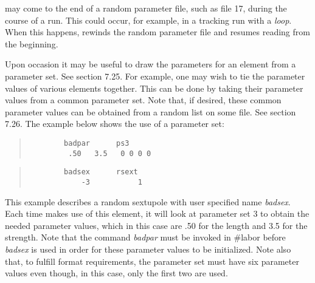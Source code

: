          \Mary may come to the end of a random parameter file, such as
file 17, during the course of a run.  This could occur, for example, in a
tracking run with a {\em loop}.  When this happens, \Mary rewinds the random
parameter file and resumes reading from the beginning.

Upon occasion it may be useful to draw the parameters for an element from
a parameter set.  See section 7.25.  For example, one may wish to tie the
parameter values of various elements together.  This can be done by
taking their parameter values from a common parameter set.  Note that, if
desired, these common parameter values can be obtained from a random list
on some file.  See section 7.26.  The example below shows the use of a
parameter set:
\begin{quotation}
\begin{verbatim}
        badpar      ps3
         .50   3.5   0 0 0 0
\end{verbatim}
\end{quotation}
\begin{quotation}
\begin{verbatim}
        badsex      rsext
            -3           1
\end{verbatim}
\end{quotation}
This example describes a random sextupole with user specified name {\em
badsex}.  Each time \Mary makes use of this element, it will look at
parameter set 3 to obtain the needed parameter values, which in this case
are .50 for the length and 3.5 for the strength.  Note that the command
{\em badpar} must be invoked in \#labor before {\em badsex} is used in
order for these parameter values to be initialized.  Note also that, to
fulfill format requirements, the parameter set must have six parameter
values even though, in this case, only the first two are used.

\newpage

